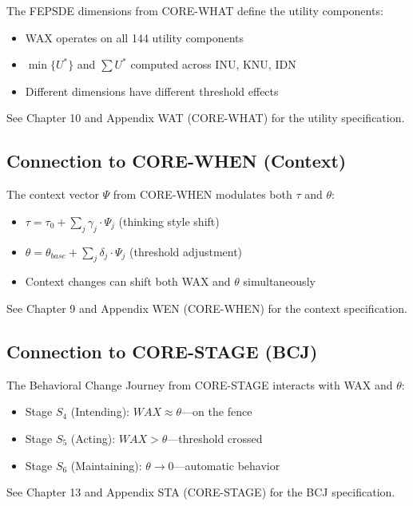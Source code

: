 \begin{cross-reference}
The FEPSDE dimensions from CORE-WHAT define the utility components:
\begin{itemize}[nosep]
  \item WAX operates on all 144 utility components
  \item $\min\{U^*\}$ and $\sum U^*$ computed across INU, KNU, IDN
  \item Different dimensions have different threshold effects
\end{itemize}
See Chapter 10 and Appendix WAT (CORE-WHAT) for the utility specification.
\end{cross-reference}

\subsection{Connection to CORE-WHEN (Context)}

\begin{cross-reference}
The context vector $\Psi$ from CORE-WHEN modulates both $\tau$ and $\theta$:
\begin{itemize}[nosep]
  \item $\tau = \tau_0 + \sum_j \gamma_j \cdot \Psi_j$ (thinking style shift)
  \item $\theta = \theta_{base} + \sum_j \delta_j \cdot \Psi_j$ (threshold adjustment)
  \item Context changes can shift both WAX and $\theta$ simultaneously
\end{itemize}
See Chapter 9 and Appendix WEN (CORE-WHEN) for the context specification.
\end{cross-reference}

\subsection{Connection to CORE-STAGE (BCJ)}

\begin{cross-reference}
The Behavioral Change Journey from CORE-STAGE interacts with WAX and $\theta$:
\begin{itemize}[nosep]
  \item Stage $S_4$ (Intending): $WAX \approx \theta$---on the fence
  \item Stage $S_5$ (Acting): $WAX > \theta$---threshold crossed
  \item Stage $S_6$ (Maintaining): $\theta \to 0$---automatic behavior
\end{itemize}
See Chapter 13 and Appendix STA (CORE-STAGE) for the BCJ specification.
\end{cross-reference}

